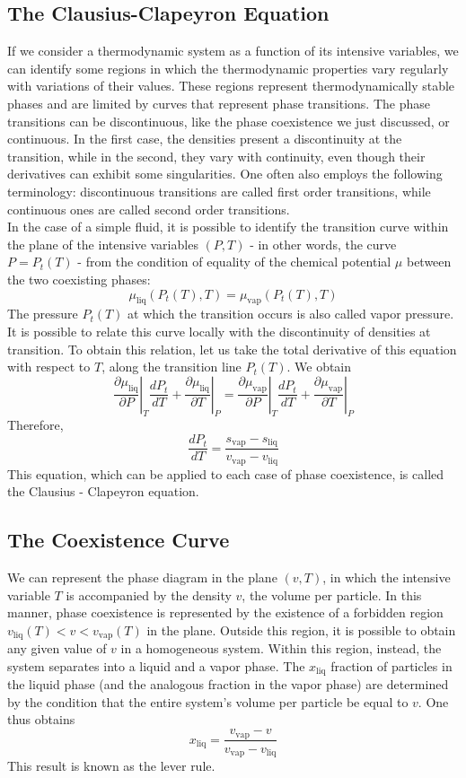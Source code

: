 \documentclass[cyan]{elegantnote}
\begin{document}
\subsection{The Clausius-­Clapeyron Equation}
If we consider a thermodynamic system as a function of its intensive variables, we can identify some regions in which the thermodynamic properties vary regularly with variations of their values. These regions represent thermodynamically stable phases and are limited by curves that represent phase transitions. The phase transitions can be discontinuous, like the phase coexistence we just discussed, or continuous. In the first case, the densities present a discontinuity at the transition, while in the second, they vary with continuity, even though their derivatives can exhibit some singularities. One often also employs the following terminology: discontinuous transitions are called first order transitions, while continuous ones are called second order transitions.
\\
In the case of a simple fluid, it is possible to identify the transition curve within the plane of the intensive variables $(P,T)$ - in other words, the curve $P= P_t(T)$ - from the condition of equality of the chemical potential $\mu$ between the two coexisting phases:
\[\mu_{\mathrm{liq}}(P_t(T),T) = \mu_{\mathrm{vap}}(P_t(T),T)\]
The pressure $P_t(T)$ at which the transition occurs is also called vapor pressure. It is possible to relate this curve locally with the discontinuity of densities at transition. To obtain this relation, let us take the total derivative of this equation with respect to $T$, along the transition line $P_t(T)$. We obtain
\[\left. \frac{\partial \mu_{\mathrm{liq}}}{\partial P} \right|_{T} \frac{dP_t}{dT} + \left. \frac{\partial \mu_{\mathrm{liq}}}{\partial T} \right|_{P} = \left. \frac{\partial \mu_{\mathrm{vap}}}{\partial P} \right|_{T} \frac{dP_t}{dT} + \left. \frac{\partial \mu_{\mathrm{vap}}}{\partial T} \right|_{P}\]
Therefore,
\[\frac{dP_t}{dT} = \frac{s_{\mathrm{vap}}-s_{\mathrm{liq}}}{v_{\mathrm{vap}}-v_{\mathrm{liq}}}\]
This equation, which can be applied to each case of phase coexistence, is called the Clausius - Clapeyron equation.

\subsection{The Coexistence Curve}
We can represent the phase diagram in the plane $(v,T)$, in which the intensive variable $T$ is accompanied by the density $v$, the volume per particle. In this manner, phase coexistence is represented by the existence of a forbidden region $v_{\mathrm{liq}}(T) < v < v_{\mathrm{vap}}(T)$ in the plane. Outside this region, it is possible to obtain any given value of $v$ in a homogeneous system. Within this region, instead, the system separates into a liquid and a vapor phase. The $x_{\mathrm{liq}}$ fraction of particles in the liquid phase (and the analogous fraction in the vapor phase) are determined by the condition that the entire system's volume per particle be equal to $v$. One thus obtains
\[x_{\mathrm{liq}} = \frac{v_{\mathrm{vap}}-v}{v_{\mathrm{vap}}-v_{\mathrm{liq}}}\]
This result is known as the lever rule.
\end{document}
